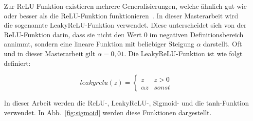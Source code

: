 \pagebreak
Zur ReLU-Funktion existieren mehrere Generalisierungen, welche ähnlich gut wie oder besser als die ReLU-Funktion funktionieren~\cite[S. 213]{goodfellowDeepLearningUmfassende2018}. In dieser Masterarbeit wird die sogenannte LeakyReLU-Funktion verwendet. Diese unterscheidet sich von der ReLU-Funktion darin, dass sie nicht den Wert 0 im negativen Definitionsbereich annimmt, sondern eine lineare Funktion mit beliebiger Steigung $\alpha$ darstellt. Oft und in dieser Masterarbeit gilt $\alpha = 0,01$. Die LeakyReLU-Funktion ist wie folgt definiert:

\begin{equation}
    leakyrelu(z) =
    \begin{cases}
        z & z > 0 \\
        \alpha z & sonst
    \end{cases}
\end{equation}

In dieser Arbeit werden die ReLU-, LeakyReLU-, Sigmoid- und die tanh-Funktion verwendet. In Abb.~\ref{fig:sigmoid} werden diese Funktionen dargestellt.




